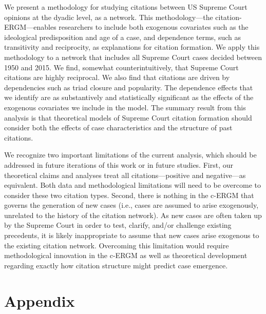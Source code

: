 \documentclass[headsepline=true, abstracton]{scrartcl}
\begin{document}
We present a methodology for studying citations between US Supreme Court opinions at the dyadic level, as a network. This methodology---the citation-ERGM---enables researchers to include both exogenous covariates such as the ideological predisposition and age of a case, and dependence terms, such as transitivity and reciprocity, as explanations for citation formation. We apply this methodology to a network that includes all Supreme Court cases decided between 1950 and 2015. We find, somewhat counterintuitively, that Supreme Court citations are highly reciprocal. We also find that citations are driven by dependencies such as triad closure and popularity. The dependence effects that we identify are as substantively and statistically significant as the effects of the exogenous covariates we include in the model. The summary result from this analysis is that theoretical models of Supreme Court citation formation should consider both the effects of case characteristics and the structure of past citations. 

We recognize two important limitations of the current analysis, which should be addressed in future iterations of this work or in future studies. First, our theoretical claims and analyses treat all citations---positive and negative---as equivalent. Both data and methodological limitations will need to be overcome to consider these two citation types. Second, there is nothing in the c-ERGM that governs the generation of new cases (i.e., cases are assumed to arise exogenously, unrelated to the history of the citation network). As new cases are often taken up by the Supreme Court in order to test, clarify, and/or challenge existing precedents, it is likely inappropriate to assume that new cases arise exogenous to the existing citation network. Overcoming this limitation would require methodological innovation in the c-ERGM as well as theoretical development regarding exactly how citation structure might predict case emergence. 


\section{Appendix}
\end{document}
